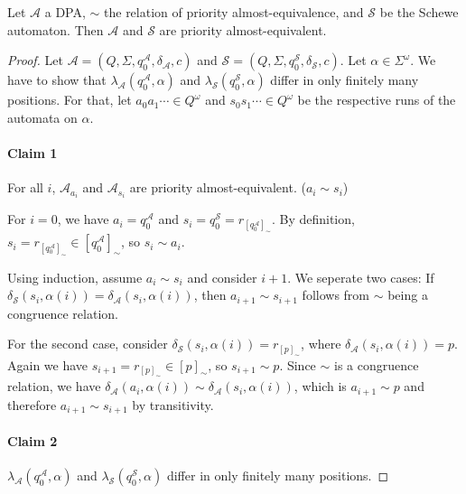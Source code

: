 \begin{lem}
	Let $\mathcal{A}$ a DPA, $\sim$ the relation of priority almost-equivalence, and $\mathcal{S}$ be the Schewe automaton. Then $\mathcal{A}$ and $\mathcal{S}$ are priority almost-equivalent.
\end{lem}

\begin{proof}
	Let $\mathcal{A} = (Q, \Sigma, q_0^\mathcal{A}, \delta_\mathcal{A}, c)$ and $\mathcal{S} = (Q, \Sigma, q_0^\mathcal{S}, \delta_\mathcal{S}, c)$. Let $\alpha \in \Sigma^\omega$. We have to show that $\lambda_\mathcal{A}(q_0^\mathcal{A}, \alpha)$ and $\lambda_\mathcal{S}(q_0^\mathcal{S}, \alpha)$ differ in only finitely many positions. For that, let $a_0 a_1 \cdots \in Q^\omega$ and $s_0 s_1 \cdots \in Q^\omega$ be the respective runs of the automata on $\alpha$.
	
	\paragraph{Claim 1} For all $i$, $\mathcal{A}_{a_i}$ and $\mathcal{A}_{s_i}$ are priority almost-equivalent. ($a_i \sim s_i$)
	
	For $i = 0$, we have $a_i = q_0^\mathcal{A}$ and $s_i = q_0^\mathcal{S} = r_{[q_0^\mathcal{A}]_\sim}$. By definition, $s_i = r_{[q_0^\mathcal{A}]_\sim} \in [q_0^\mathcal{A}]_\sim$, so $s_i \sim a_i$.
	
	Using induction, assume $a_i \sim s_i$ and consider $i+1$. We seperate two cases: If $\delta_\mathcal{S}(s_i, \alpha(i)) = \delta_\mathcal{A}(s_i, \alpha(i))$, then $a_{i+1} \sim s_{i+1}$ follows from $\sim$ being a congruence relation.
	
	For the second case, consider $\delta_\mathcal{S}(s_i, \alpha(i)) = r_{[p]_\sim}$, where $\delta_\mathcal{A}(s_i, \alpha(i)) = p$. Again we have $s_{i+1} = r_{[p]_\sim} \in [p]_\sim$, so $s_{i+1} \sim p$. Since $\sim$ is a congruence relation, we have $\delta_\mathcal{A}(a_i, \alpha(i)) \sim \delta_\mathcal{A}(s_i, \alpha(i))$, which is $a_{i+1} \sim p$ and therefore $a_{i+1} \sim s_{i+1}$ by transitivity.
	
	\paragraph{Claim 2} $\lambda_\mathcal{A}(q_0^\mathcal{A}, \alpha)$ and $\lambda_\mathcal{S}(q_0^\mathcal{S}, \alpha)$ differ in only finitely many positions.
	

\end{proof}
